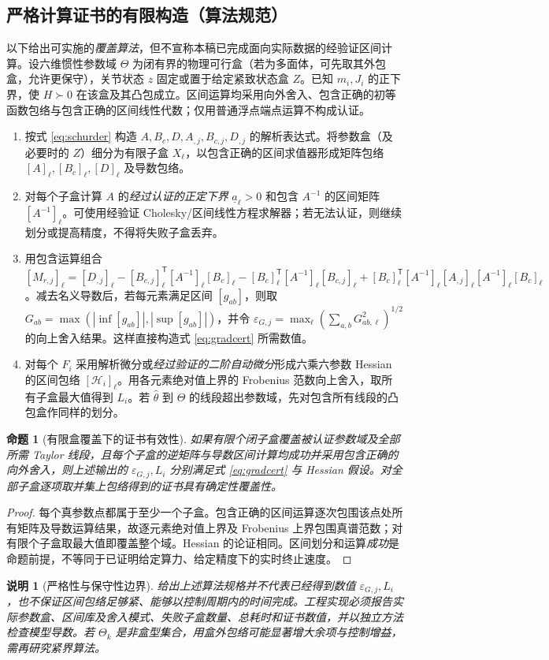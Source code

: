 \documentclass[journal,onecolumn]{IEEEtran}
\newtheorem{proposition}{命题}[section]
\newtheorem{remark}{说明}[section]
\newcommand{\tr}{\mathsf T}
\begin{document}
\subsection{严格计算证书的有限构造（算法规范）}
以下给出可实施的\emph{覆盖算法}，但不宣称本稿已完成面向实际数据的经验证区间计算。设六维惯性参数域 $\Theta$ 为闭有界的物理可行盒（若为多面体，可先取其外包盒，允许更保守），关节状态 $z$ 固定或置于给定紧致状态盒 $Z$。已知 $m_i,J_i$ 的正下界，使 $H\succ0$ 在该盒及其凸包成立。区间运算均采用向外舍入、包含正确的初等函数包络与包含正确的区间线性代数；仅用普通浮点端点运算不构成认证。
\begin{enumerate}[label=(A\arabic*)]
\item 按式 \eqref{eq:schurder} 构造 $A,B_c,D,A_{,j},B_{c,j},D_{,j}$ 的解析表达式。将参数盒（及必要时的 $Z$）细分为有限子盒 $X_\ell$，以包含正确的区间求值器形成矩阵包络 $[A]_{\ell},[B_c]_{\ell},[D]_{\ell}$ 及导数包络。
\item 对每个子盒计算 $A$ 的\emph{经过认证的正定下界} $\underline a_\ell>0$ 和包含 $A^{-1}$ 的区间矩阵 $[A^{-1}]_\ell$。可使用经验证 Cholesky/区间线性方程求解器；若无法认证，则继续划分或提高精度，不得将失败子盒丢弃。
\item 用包含运算组合 $[M_{r,j}]_\ell=[D_{,j}]_\ell-[B_{c,j}]_\ell^\tr[A^{-1}]_\ell[B_c]_\ell-[B_c]_\ell^\tr[A^{-1}]_\ell[B_{c,j}]_\ell+[B_c]_\ell^\tr[A^{-1}]_\ell[A_{,j}]_\ell[A^{-1}]_\ell[B_c]_\ell$。减去名义导数后，若每元素满足区间 $[g_{ab}]$，则取 $G_{ab}=\max(|\inf[g_{ab}]|,|\sup[g_{ab}]|)$，并令 $\varepsilon_{G,j}=\max_\ell(\sum_{a,b}G_{ab,\ell}^2)^{1/2}$ 的向上舍入结果。这样直接构造式 \eqref{eq:gradcert} 所需数值。
\item 对每个 $F_i$ 采用解析微分或\emph{经过验证的二阶自动微分}形成六乘六参数 Hessian 的区间包络 $[\mathcal H_i]_\ell$。用各元素绝对值上界的 Frobenius 范数向上舍入，取所有子盒最大值得到 $L_i$。若 $\hat\theta$ 到 $\Theta$ 的线段超出参数域，先对包含所有线段的凸包盒作同样的划分。
\end{enumerate}
\begin{proposition}[有限盒覆盖下的证书有效性]
如果有限个闭子盒覆盖被认证参数域及全部所需 Taylor 线段，且每个子盒的逆矩阵与导数区间计算均成功并采用包含正确的向外舍入，则上述输出的 $\varepsilon_{G,j},L_i$ 分别满足式 \eqref{eq:gradcert} 与 Hessian 假设。对全部子盒逐项取并集上包络得到的证书具有确定性覆盖性。
\end{proposition}
\begin{proof}
每个真参数点都属于至少一个子盒。包含正确的区间运算逐次包围该点处所有矩阵及导数运算结果，故逐元素绝对值上界及 Frobenius 上界包围真谱范数；对有限个子盒取最大值即覆盖整个域。Hessian 的论证相同。区间划分和运算\emph{成功}是命题前提，不等同于已证明给定算力、给定精度下的实时终止速度。
\end{proof}
\begin{remark}[严格性与保守性边界]
给出上述算法规格并不代表已经得到数值 $\varepsilon_{G,j},L_i$，也不保证区间包络足够紧、能够以控制周期内的时间完成。工程实现必须报告实际参数盒、区间库及舍入模式、失败子盒数量、总耗时和证书数值，并以独立方法检查模型导数。若 $\Theta_k$ 是非盒型集合，用盒外包络可能显著增大余项与控制增益，需再研究紧界算法。
\end{remark}
\end{document}
